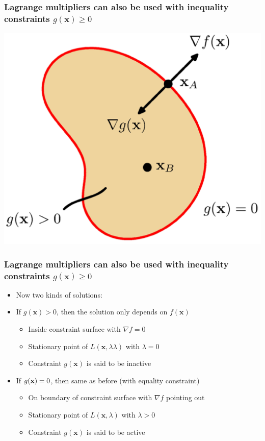 \documentclass[12pt,notes,mathserif]{beamer}
\begin{document}
\begin{frame}[c]
	\frametitle{Lagrange multipliers can also be used with inequality constraints $g(\mathbf{x})\geqslant{}0$}
	\begin{center}
		\includegraphics[width=0.65\linewidth]{fig8/lec832.jpg}
	\end{center}
\end{frame}


\begin{frame}[c]
	\frametitle{Lagrange multipliers can also be used with inequality constraints $g(\mathbf{x})\geqslant{}0$}
	\begin{itemize}
		\item Now two kinds of solutions:
		\item If $g(\mathbf{x})> 0$, then the solution only depends on $f(\mathbf{x})$
		      \begin{itemize}
			      \item Inside constraint surface with $\nabla f= 0$
			      \item Stationary point of $L(\mathbf{x},𝜆\lambda)$ with $\lambda= 0$
			      \item Constraint $g(\mathbf{x})$ is said to be inactive
		      \end{itemize}
		\item If $g(\mathbf{x})= 0$, then same as before (with equality constraint)
		      \begin{itemize}
			      \item On boundary of constraint surface with $\nabla f$ pointing out
			      \item Stationary point of $L(\mathbf{x},\lambda)$ with $\lambda> 0$
			      \item Constraint $g(\mathbf{x})$ is said to be active
		      \end{itemize}

	\end{itemize}
\end{frame}
\end{document}
